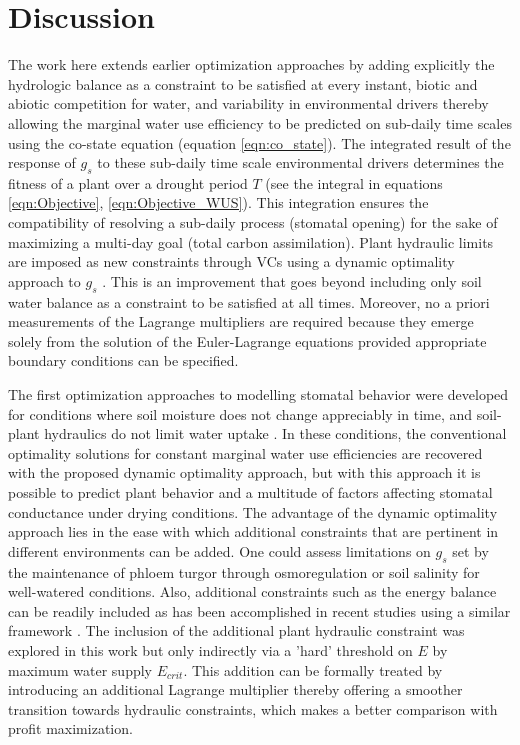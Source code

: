 \documentclass[utf8]{frontiersSCNS} %
\begin{document}
\section{Discussion}

The work here extends earlier optimization approaches by adding explicitly the hydrologic balance as a constraint to be satisfied at every instant, biotic and abiotic competition for water, and variability in environmental drivers thereby allowing the marginal water use efficiency to be predicted on sub-daily time scales using the co-state equation (equation \ref{eqn:co_state}). The integrated result of the response of $g_s$ to these sub-daily time scale environmental drivers determines the fitness of a plant over a drought period $T$ (see the integral in equations \ref{eqn:Objective}, \ref{eqn:Objective_WUS}). This integration ensures the compatibility of resolving a sub-daily process (stomatal opening) for the sake of maximizing a multi-day goal (total carbon assimilation).  Plant hydraulic limits are imposed as new constraints through VCs using a dynamic optimality approach to $g_s$ \citep{manzoni_optimization_2013}. This is an improvement that goes beyond including only soil water balance as a constraint to be satisfied at all times. Moreover, no a priori measurements of the Lagrange multipliers are required because they emerge solely from the solution of the Euler-Lagrange equations \citep{witelski_variational_2015} provided appropriate boundary conditions can be specified.

The first optimization approaches to modelling stomatal behavior were developed for conditions where soil moisture does not change appreciably in time, and soil-plant hydraulics do not limit water uptake \citep{cowan_stomatal_1977, cowan_stomatal_1978}. In these conditions, the conventional optimality solutions for constant marginal water use efficiencies  \citep{katul_stomatal_2009} are recovered with the proposed dynamic optimality approach, but with this approach it is possible to predict plant behavior and a multitude of factors affecting stomatal conductance under drying conditions. The advantage of the dynamic optimality approach lies in the ease with which additional constraints that are pertinent in different environments can be added. One could assess limitations on $g_s$ set by the maintenance of phloem turgor through osmoregulation \citep{sevanto_how_2014} or soil salinity for well-watered conditions. Also, additional constraints such as the energy balance can be readily included as has been accomplished in recent studies using a similar framework \citep{roth2018fossil}.  The inclusion of the additional plant hydraulic constraint was explored in this work but only indirectly via a 'hard' threshold on $E$ by maximum water supply $E_{crit}$. This addition can be formally treated by introducing an additional Lagrange multiplier thereby offering a smoother transition towards hydraulic constraints, which makes a better comparison with profit maximization.
\end{document}

